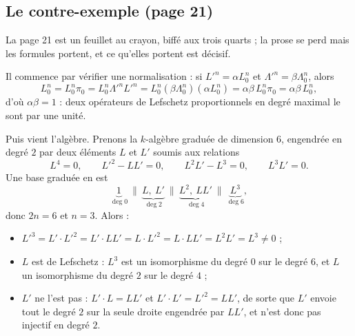 \documentclass[11pt,a4paper]{article}
\begin{document}
\subsection*{Le contre-exemple (page 21)}

La page 21 est un feuillet au crayon, biffé aux trois quarts ; la prose se perd
mais les formules portent, et ce qu'elles portent est décisif.

Il commence par vérifier une normalisation : si $L'^{n} = \alpha L_{0}^{n}$ et
$\Lambda'^{n} = \beta \Lambda_{0}^{n}$, alors
\[
L_{0}^{n} = L_{0}^{n}\pi_{0} = L_{0}^{n}\Lambda'^{n}L'^{n}
= L_{0}^{n}(\beta\Lambda_{0}^{n})(\alpha L_{0}^{n})
= \alpha\beta\,L_{0}^{n}\pi_{0} = \alpha\beta\,L_{0}^{n},
\]
d'où $\alpha\beta = 1$ : deux opérateurs de Lefschetz proportionnels en degré
maximal le sont par une unité.

Puis vient l'algèbre. Prenons la $k$-algèbre graduée de dimension $6$,
engendrée en degré $2$ par deux éléments $L$ et $L'$ soumis aux relations
\[
L^{4} = 0, \qquad L'^{2} - LL' = 0, \qquad L^{2}L' - L^{3} = 0, \qquad L^{3}L' = 0 .
\]
Une base graduée en est
\[
\underbrace{1}_{\deg 0} \ \Big\| \ \underbrace{L,\ L'}_{\deg 2}
\ \Big\| \ \underbrace{L^{2},\ LL'}_{\deg 4} \ \Big\| \ \underbrace{L^{3}}_{\deg 6},
\]
donc $2n = 6$ et $n = 3$. Alors :

\begin{itemize}
  \item $L'^{3} = L'\cdot L'^{2} = L'\cdot LL' = L\cdot L'^{2} = L\cdot LL'
  = L^{2}L' = L^{3} \neq 0$ ;
  \item $L$ est de Lefschetz : $L^{3}$ est un isomorphisme du degré $0$ sur le
  degré $6$, et $L$ un isomorphisme du degré $2$ sur le degré $4$ ;
  \item $L'$ ne l'est pas : $L' \cdot L = LL'$ et $L' \cdot L' = L'^{2} = LL'$,
  de sorte que $L'$ envoie tout le degré $2$ sur la seule droite engendrée par
  $LL'$, et n'est donc pas injectif en degré $2$.
\end{itemize}
\end{document}
